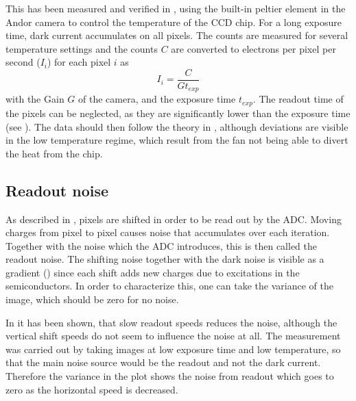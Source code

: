 This has been measured and verified in , using the built-in peltier element in the Andor camera to control the temperature of the CCD chip. For a long exposure time, dark current accumulates on all pixels. The counts are measured for several temperature settings and the counts $C$ are converted to electrons per pixel per second ($I_i$)\cite{Ottenstein2006} for each pixel $i$ as
\begin{equation}
I_{i} = \frac{C}{G t_{exp}}
\end{equation}
with the Gain $G$ of the camera, and the exposure time $t_{exp}$. The readout time of the pixels can be neglected, as they are significantly lower than the exposure time (see ).
The data should then follow the theory in , although deviations are visible in the low temperature regime, which result from the fan not being able to divert the heat from the chip.


\subsection{Readout noise}
As described in , pixels are shifted in order to be read out by the ADC. Moving charges from pixel to pixel causes noise that accumulates over each iteration. Together with the noise which the ADC introduces, this is then called the readout noise. The shifting noise together with the dark noise is visible as a gradient () since each shift adds new charges due to excitations in the semiconductors. In order to characterize this, one can take the variance of the image, which should be zero for no noise.

In  it has been shown, that slow readout speeds reduces the noise, although the vertical shift speeds do not seem to influence the noise at all. The measurement was carried out by taking images at low exposure time and low temperature, so that the main noise source would be the readout and not the dark current. Therefore the variance in the plot shows the noise from readout which goes to zero as the horizontal speed is decreased.

